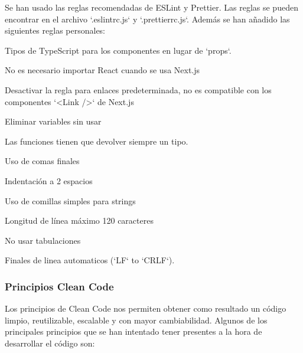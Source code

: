 \documentclass[12pt,twoside,titlepage]{report}
\begin{document}
Se han usado las reglas recomendadas de ESLint y Prettier. Las reglas se pueden encontrar en el archivo `.eslintrc.js` y `.prettierrc.js`. Además se han añadido las siguientes reglas personales:

\begin{compactitem}
    \item Tipos de TypeScript para los componentes en lugar de `props`.
    \item No es necesario importar React cuando se usa Next.js
    \item Desactivar la regla para enlaces predeterminada, no es compatible con los componentes `<Link />` de Next.js
    \item Eliminar variables sin usar
    \item Las funciones tienen que devolver siempre un tipo.
    \item Uso de comas finales
    \item Indentación a 2 espacios
    \item Uso de comillas simples para strings
    \item Longitud de línea máximo 120 caracteres
    \item No usar tabulaciones
    \item Finales de linea automaticos (`LF` to `CRLF`).
\end{compactitem}

\subsubsection{Principios Clean Code}

Los principios de Clean Code nos permiten obtener como resultado un código limpio, reutilizable, escalable y con mayor cambiabilidad. Algunos de los principales principios que se han intentado tener presentes a la hora de desarrollar el código son:
\end{document}
